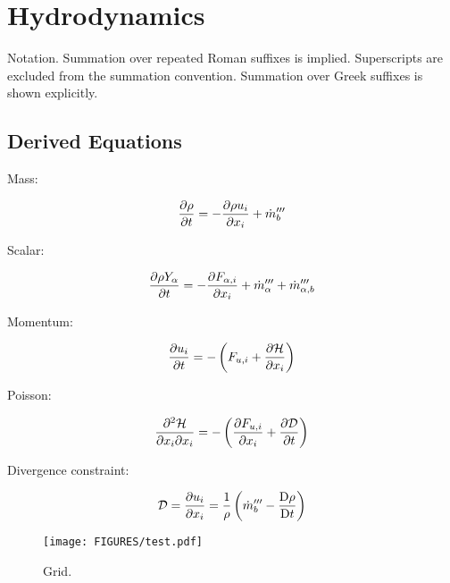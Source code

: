 \documentclass[11pt]{article}
\begin{document}
\section{Hydrodynamics}

Notation.  Summation over repeated Roman suffixes is implied.  Superscripts are excluded from the summation convention.  Summation over Greek suffixes is shown explicitly.

\subsection{Derived Equations}

Mass:

\begin{equation}
\label{eqn_mass}
\frac{\partial \rho}{\partial t} = - \frac{\partial \rho u_i}{\partial x_i} + \dot{m}_b^{\prime\prime\prime}
\end{equation}

Scalar:

\begin{equation}
\label{eqn_scalar}
\frac{\partial \rho Y_\alpha}{\partial t} = - \frac{\partial F_{\alpha,i}}{\partial x_i} + \dot{m}_{\alpha}^{\prime\prime\prime} + \dot{m}_{\alpha,b}^{\prime\prime\prime} 
\end{equation}

Momentum:

\begin{equation}
\label{eqn_momentum}
\frac{\partial u_i}{\partial t} = - \left( F_{u,i} + \frac{\partial \cal H}{\partial x_i} \right)
\end{equation}

Poisson:

\begin{equation}
\label{eqn_poisson}
\frac{\partial^2 \cal H}{\partial x_i \partial x_i} = - \left(\frac{\partial F_{u,i}}{\partial x_i} + \frac{\partial {\cal D}}{\partial t}\right)
\end{equation}

Divergence constraint:

\begin{equation}
\label{eqn_divergence}
{\cal D} = \frac{\partial u_i}{\partial x_i} = \frac{1}{\rho}\left(\dot{m}_b^{\prime\prime\prime} - \frac{\mbox{D}\rho}{\mbox{D}t}\right)
\end{equation}

\begin{figure}[t]
   \begin{center}
      \texttt{[image: FIGURES/test.pdf]}
      \caption{\label{fig_grid} \small Grid.}
   \end{center}
\end{figure}
\end{document}
